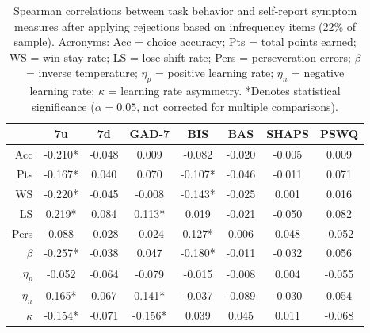 \documentclass[a4paper,notitlepage,12pt]{article}
\begin{document}
\begin{table}[h!]
\centering
\small
\begin{tabular}{rccccccc}
\toprule
{} &       7u &      7d &    GAD-7 &      BIS &     BAS &   SHAPS &    PSWQ \\
\midrule
Acc      &  -0.210* &  -0.048 &    0.009 &   -0.082 &  -0.020 &  -0.005 &   0.009 \\
Pts      &  -0.167* &   0.040 &    0.070 &  -0.107* &  -0.046 &  -0.011 &   0.071 \\
WS       &  -0.220* &  -0.045 &   -0.008 &  -0.143* &  -0.025 &   0.001 &   0.016 \\
LS       &   0.219* &   0.084 &   0.113* &    0.019 &  -0.021 &  -0.050 &   0.082 \\
Pers     &    0.088 &  -0.028 &   -0.024 &   0.127* &   0.006 &   0.048 &  -0.052 \\
$\beta$  &  -0.257* &  -0.038 &    0.047 &  -0.180* &  -0.011 &  -0.032 &   0.056 \\
$\eta_p$ &   -0.052 &  -0.064 &   -0.079 &   -0.015 &  -0.008 &   0.004 &  -0.055 \\
$\eta_n$ &   0.165* &   0.067 &   0.141* &   -0.037 &  -0.089 &  -0.030 &   0.054 \\
$\kappa$ &  -0.154* &  -0.071 &  -0.156* &    0.039 &   0.045 &   0.011 &  -0.068 \\
\bottomrule
\end{tabular}
\caption{Spearman correlations between task behavior and self-report symptom measures after applying rejections based on infrequency items (22\% of sample). Acronyms: Acc = choice accuracy; Pts = total points earned; WS = win-stay rate; LS = lose-shift rate; Pers = perseveration errors; $\beta$ = inverse temperature; $\eta_p$ = positive learning rate; $\eta_n$ = negative learning rate; $\kappa$ = learning rate asymmetry. *Denotes statistical significance ($\alpha=0.05$, not corrected for multiple comparisons).}
\end{table}
\end{document}
